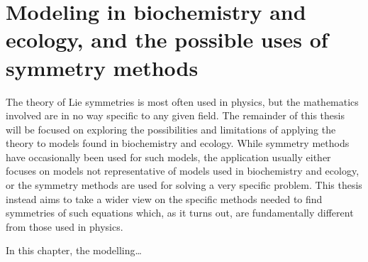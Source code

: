 \chapter{Modeling in biochemistry and ecology, and the possible uses of symmetry methods}

The theory of Lie symmetries is most often used in physics, but the mathematics involved are in no way specific to any given field.
The remainder of this thesis will be focused on exploring the possibilities and limitations of applying the theory to models found in biochemistry and ecology.
While symmetry methods have occasionally been used for such models, the application usually either focuses on models not representative of models used in biochemistry and ecology, or the symmetry methods are used for solving a very specific problem.
This thesis instead aims to take a wider view on the specific methods needed to find symmetries of such equations which, as it turns out, are fundamentally different from those used in physics.

In this chapter, the modelling\dots
